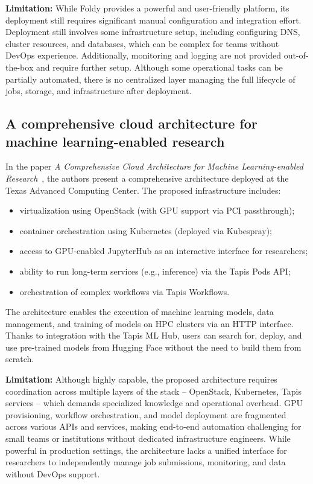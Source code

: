 \textbf{Limitation:} While Foldy provides a powerful and user-friendly platform, its deployment still requires significant manual configuration and integration effort.
Deployment still involves some infrastructure setup, including configuring DNS, cluster resources, and databases, which can be complex for teams without DevOps experience.
Additionally, monitoring and logging are not provided out-of-the-box and require further setup.
Although some operational tasks can be partially automated, there is no centralized layer managing the full lifecycle of jobs, storage, and infrastructure after deployment.

\subsection{A comprehensive cloud architecture for machine learning-enabled research}

In the paper \textit{A Comprehensive Cloud Architecture for Machine Learning-enabled Research}~\cite{cloud_architecture_for_research}, the authors present a comprehensive architecture deployed at the Texas Advanced Computing Center.
The proposed infrastructure includes:
\begin{itemize}
    \item virtualization using OpenStack (with GPU support via PCI passthrough);
    \item container orchestration using Kubernetes (deployed via Kubespray);
    \item access to GPU-enabled JupyterHub as an interactive interface for researchers;
    \item ability to run long-term services (e.g., inference) via the Tapis Pods API;
    \item orchestration of complex workflows via Tapis Workflows.
\end{itemize}

The architecture enables the execution of machine learning models, data management, and training of models on HPC clusters via an HTTP interface.
Thanks to integration with the Tapis ML Hub, users can search for, deploy, and use pre-trained models from Hugging Face without the need to build them from scratch.

\textbf{Limitation:} Although highly capable, the proposed architecture requires coordination across multiple layers of the stack -- OpenStack, Kubernetes, Tapis services -- which demands specialized knowledge and operational overhead.
GPU provisioning, workflow orchestration, and model deployment are fragmented across various APIs and services, making end-to-end automation challenging for small teams or institutions without dedicated infrastructure engineers.
While powerful in production settings, the architecture lacks a unified interface for researchers to independently manage job submissions, monitoring, and data without DevOps support.

